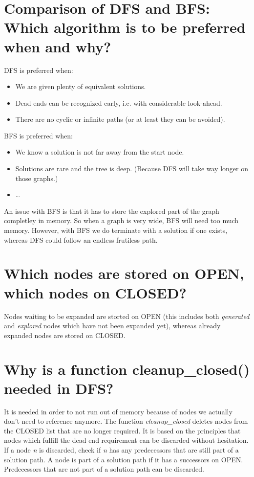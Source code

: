 \documentclass[12pt, a4paper]{article}
\begin{document}
\section{Comparison of DFS and BFS: Which algorithm is to be preferred when and why?}
DFS is preferred when:
\begin{itemize}
\item We are given plenty of equivalent solutions.
\item Dead ends can be recognized early, i.e. with considerable look-ahead.
\item There are no cyclic or infinite paths (or at least they can be avoided).
\end{itemize}
BFS is preferred when:
\begin{itemize}
\item We know a solution is not far away from the start node.
\item Solutions are rare and the tree is deep. (Because DFS will take way longer on those graphs.)
\item \ldots 
\end{itemize}
An issue with BFS is that it has to store the explored part of the graph completley in memory. So when a graph is very wide, BFS will need too much memory. However, with BFS we do terminate with a solution if one exists, whereas DFS could follow an endless frutiless path.

\section{Which nodes are stored on OPEN, which nodes on CLOSED?}
Nodes waiting to be expanded are storted on OPEN (this includes both \textit{generated} and \textit{explored} nodes which have not been expanded yet), whereas already expanded nodes are stored on CLOSED.

\section{Why is a function cleanup\_closed() needed in DFS?}
It is needed in order to not run out of memory because of nodes we actually don't need to reference anymore. The function \textit{cleanup\_closed} deletes nodes from the CLOSED list that are no longer required. It is based on the principles that nodes which fulfill the dead end requirement can be discarded without hesitation. If a node \textit{n} is discarded, check if  \textit{n} has any predecessors that are still part of a solution path. A node is part of a solution path if it has a successors on OPEN. Predecessors that are not part of a solution path can be discarded.
\end{document}
